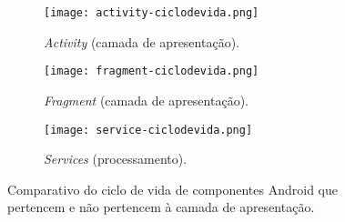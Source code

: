 \begin{figure*}[!htb]
\centering
  \begin{subfigure}[b]{.33\textwidth}
    \centering
    \texttt{[image: activity-ciclodevida.png]}
    \caption{\textit{Activity} (camada de apresentação).}
    \label{fig:activity-lifecycle}
  \end{subfigure}
  \begin{subfigure}[b]{.33\textwidth}
    \centering
    \texttt{[image: fragment-ciclodevida.png]}
    \caption{\textit{Fragment} (camada de apresentação).}
    \label{fig:activity-lifecycle}
  \end{subfigure}
  \begin{subfigure}[b]{.33\textwidth}
    \centering
    \texttt{[image: service-ciclodevida.png]}
    \caption{\textit{Services} (processamento).}
    \label{fig:service-lifecycle}
  \end{subfigure}%
\caption{Comparativo do ciclo de vida de componentes Android que pertencem e não pertencem à camada de apresentação.}
\label{fig:android-lifecycles}
\vspace{-.5cm} 
\end{figure*}

